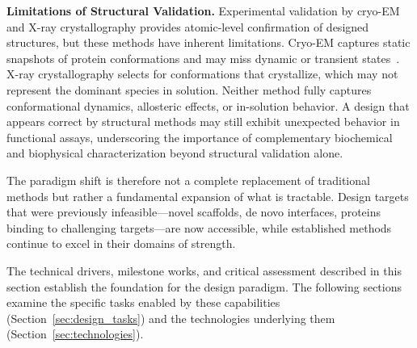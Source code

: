 \vspace{0.5em}
\noindent
\textbf{Limitations of Structural Validation.} Experimental validation by cryo-EM and X-ray crystallography provides atomic-level confirmation of designed structures, but these methods have inherent limitations. Cryo-EM captures static snapshots of protein conformations and may miss dynamic or transient states~\citep{kleywegt2023validation}. X-ray crystallography selects for conformations that crystallize, which may not represent the dominant species in solution. Neither method fully captures conformational dynamics, allosteric effects, or in-solution behavior. A design that appears correct by structural methods may still exhibit unexpected behavior in functional assays, underscoring the importance of complementary biochemical and biophysical characterization beyond structural validation alone.

The paradigm shift is therefore not a complete replacement of traditional methods but rather a fundamental expansion of what is tractable. Design targets that were previously infeasible---novel scaffolds, de novo interfaces, proteins binding to challenging targets---are now accessible, while established methods continue to excel in their domains of strength.

\vspace{1em}
\noindent
The technical drivers, milestone works, and critical assessment described in this section establish the foundation for the design paradigm. The following sections examine the specific tasks enabled by these capabilities (Section~\ref{sec:design_tasks}) and the technologies underlying them (Section~\ref{sec:technologies}).
